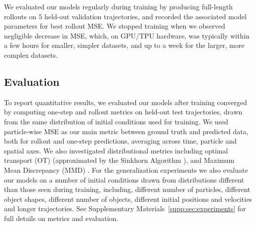 \documentclass{article}
\begin{document}
We evaluated our models regularly during training by producing full-length rollouts on 5 held-out validation trajectories, and recorded the associated model parameters for best rollout MSE. We stopped training when we observed negligible decrease in MSE, which, on GPU/TPU hardware, was typically within a few hours for smaller, simpler datasets, and up to a week for the larger, more complex datasets.


\subsection{Evaluation}
\label{sec:experiment:evaluation}

To report quantitative results, we evaluated our models after training converged by computing one-step and rollout metrics on held-out test trajectories, drawn from the same distribution of initial conditions used for training.
%
We used particle-wise MSE as our main metric between ground truth and predicted data, both for rollout and one-step predictions, averaging across time, particle and spatial axes. We also investigated distributional metrics including optimal transport (OT) \cite{villani2003topics} (approximated by the Sinkhorn Algorithm \cite{cuturi2013sinkhorn}), and Maximum Mean Discrepancy (MMD) \cite{gretton2012kernel}. 
%
For the generalization experiments we also evaluate our models on a number of initial conditions drawn from distributions different than those seen during training, including, different number of particles, different object shapes, different number of objects, different initial  positions and velocities and longer trajectories.
%
See Supplementary Materials~\ref{supp:sec:experiments} for full details on metrics and evaluation.
\end{document}
